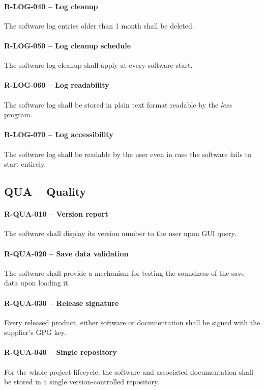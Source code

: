 \paragraph{R-LOG-040 -- Log cleanup}
The software log entries older than 1 month shall be deleted.

\paragraph{R-LOG-050 -- Log cleanup schedule}
The software log cleanup shall apply at every software start.

\paragraph{R-LOG-060 -- Log readability}
The software log shall be stored in plain text format readable
by the \emph{less} program.

\paragraph{R-LOG-070 -- Log accessibility}
The software log shall be readable by the user even in case the software
fails to start entirely.

\subsection{QUA -- Quality}
\paragraph{R-QUA-010 -- Version report}
The software shall display its version number to the user upon \gls{GUI} query.

\paragraph{R-QUA-020 -- Save data validation}
The software shall provide a mechanism for testing the soundness of the
save data upon loading it.

\paragraph{R-QUA-030 -- Release signature}
Every released product, either software or documentation shall be signed
with the supplier's GPG key.

\paragraph{R-QUA-040 -- Single repository}
For the whole project lifecycle, the software and associated documentation shall
be stored in a single version-controlled repository.

